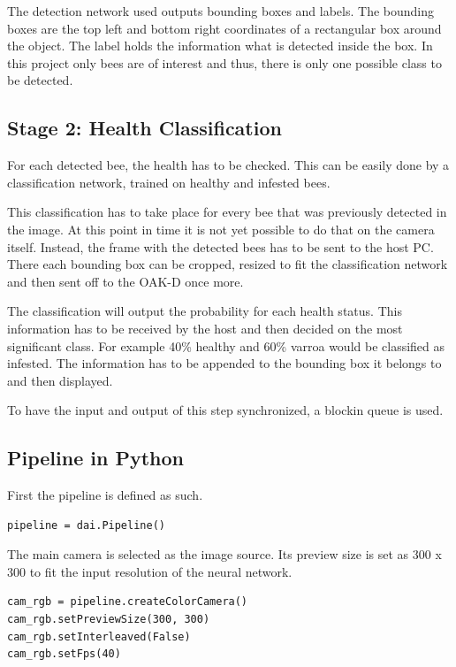 \documentclass[a4paper,titlepage]{article}
\begin{document}
The detection network used outputs bounding boxes and labels.
The bounding boxes are the top left and bottom right coordinates of a rectangular box around the object.
The label holds the information what is detected inside the box.
In this project only bees are of interest and thus, there is only one possible class to be detected.

\subsection{Stage 2: Health Classification}

For each detected bee, the health has to be checked.
This can be easily done by a classification network, trained on healthy and infested bees.

This classification has to take place for every bee that was previously detected in the image.
At this point in time it is not yet possible to do that on the camera itself.
Instead, the frame with the detected bees has to be sent to the host PC.
There each bounding box can be cropped, resized to fit the classification network and then sent off to the OAK-D once more.

The classification will output the probability for each health status.
This information has to be received by the host and then decided on the most significant class.
For example 40\% healthy and 60\% varroa would be classified as infested.
The information has to be appended to the bounding box it belongs to and then displayed.

To have the input and output of this step synchronized, a blockin queue is used.

\newpage
\subsection{Pipeline in Python}

First the pipeline is defined as such.

\begin{lstlisting}
pipeline = dai.Pipeline()
\end{lstlisting}

The main camera is selected as the image source.
Its preview size is set as 300 x 300 to fit the input resolution of the neural network.

\begin{lstlisting}
cam_rgb = pipeline.createColorCamera()
cam_rgb.setPreviewSize(300, 300)
cam_rgb.setInterleaved(False)
cam_rgb.setFps(40)
\end{lstlisting}
\end{document}
